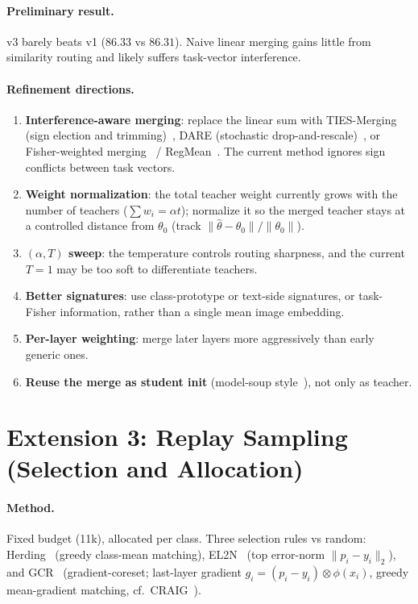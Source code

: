 \documentclass[11pt]{article}
\begin{document}
\paragraph{Preliminary result.} v3 barely beats v1 ($86.33$ vs $86.31$). Naive linear merging gains
little from similarity routing and likely suffers task-vector interference.

\paragraph{Refinement directions.}
\begin{enumerate}
  \item \textbf{Interference-aware merging}: replace the linear sum with TIES-Merging (sign election
        and trimming)~\cite{ties}, DARE (stochastic drop-and-rescale)~\cite{dare}, or Fisher-weighted
        merging~\cite{fisher} / RegMean~\cite{regmean}. The current method ignores sign conflicts
        between task vectors.
  \item \textbf{Weight normalization}: the total teacher weight currently grows with the number of
        teachers ($\sum w_i=\alpha t$); normalize it so the merged teacher stays at a controlled
        distance from $\theta_0$ (track $\lVert\hat\theta-\theta_0\rVert/\lVert\theta_0\rVert$).
  \item \textbf{$(\alpha,T)$ sweep}: the temperature controls routing sharpness, and the current
        $T{=}1$ may be too soft to differentiate teachers.
  \item \textbf{Better signatures}: use class-prototype or text-side signatures, or task-Fisher
        information, rather than a single mean image embedding.
  \item \textbf{Per-layer weighting}: merge later layers more aggressively than early generic ones.
  \item \textbf{Reuse the merge as student init} (model-soup style~\cite{soups}), not only as teacher.
\end{enumerate}

\section{Extension 3: Replay Sampling (Selection and Allocation)}

\paragraph{Method.} Fixed budget (11k), allocated per class. Three selection rules vs random:
Herding~\cite{icarl,herding} (greedy class-mean matching), EL2N~\cite{el2n} (top error-norm
$\lVert p_i-y_i\rVert_2$), and GCR~\cite{gcr} (gradient-coreset; last-layer gradient
$g_i=(p_i-y_i)\otimes\phi(x_i)$, greedy mean-gradient matching, cf.\ CRAIG~\cite{craig}).
\end{document}
